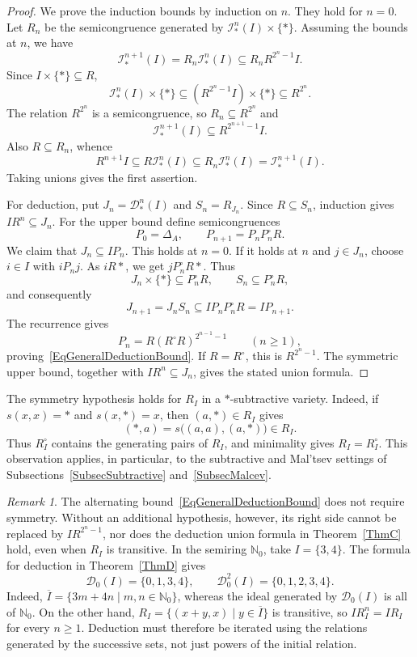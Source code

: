 \documentclass[12pt,english]{amsart}
\theoremstyle{definition}
\numberwithin{equation}{section}
\theoremstyle{remark}
\newtheorem{remark}[theorem]{Remark}
\newcommand{\indn}[2]{\mathcal{I}^{#2}_\top(#1)}
\newcommand{\dedn}[2]{\mathcal{D}^{#2}_\top(#1)}
\renewcommand{\top}{\ast}
\begin{document}
\begin{proof}
We prove the induction bounds by induction on $n$. They hold for $n=0$.
Let $R_n$ be the semicongruence generated by
$\indn In\times\{\top\}$. Assuming the bounds at $n$, we have
\[
\indn I{n+1}=R_n\indn In\subseteq R_nR^{2^n-1}I.
\]
Since $I\times\{\top\}\subseteq R$,
\[
\indn In\times\{\top\}\subseteq
(R^{2^n-1}I)\times\{\top\}\subseteq R^{2^n}.
\]
The relation $R^{2^n}$ is a semicongruence, so $R_n\subseteq R^{2^n}$ and
\[
\indn I{n+1}\subseteq R^{2^{n+1}-1}I.
\]
Also $R\subseteq R_n$, whence
\[
R^{n+1}I\subseteq R\indn In
\subseteq R_n\indn In=\indn I{n+1}.
\]
Taking unions gives the first assertion.

For deduction, put $J_n=\dedn In$ and $S_n=R_{J_n}$. Since
$R\subseteq S_n$, induction gives $IR^n\subseteq J_n$.
For the upper bound define semicongruences
\[
P_0=\Delta_A,\qquad P_{n+1}=P_nP_n^\circ R.
\]
We claim that $J_n\subseteq IP_n$. This holds at $n=0$. If it holds
at $n$ and $j\in J_n$, choose $i\in I$ with $iP_nj$.
As $iR\top$, we get $jP_n^\circ R\top$. Thus
\[
J_n\times\{\top\}\subseteq P_n^\circ R,\qquad
S_n\subseteq P_n^\circ R,
\]
and consequently
\[
J_{n+1}=J_nS_n\subseteq IP_nP_n^\circ R=IP_{n+1}.
\]
The recurrence gives
\[
P_n=R(R^\circ R)^{2^{n-1}-1}\qquad(n\geqslant1),
\]
proving~\eqref{EqGeneralDeductionBound}. If $R=R^\circ$, this is
$R^{2^n-1}$. The symmetric upper bound, together with
$IR^n\subseteq J_n$, gives the stated union formula.
\end{proof}

The symmetry hypothesis holds for $R_I$ in a $\top$-subtractive variety. Indeed, if $s(x,x)=\top$ and $s(x,\top)=x$, then $(a,\top)\in R_I$ gives
\[
(\top,a)=s\bigl((a,a),(a,\top)\bigr)\in R_I.
\]
Thus $R_I^\circ$ contains the generating pairs of $R_I$, and minimality gives $R_I=R_I^\circ$. This observation applies, in particular, to the subtractive and Mal'tsev settings of Subsections~\ref{SubsecSubtractive} and~\ref{SubsecMalcev}.

\begin{remark}\label{RemDeductionCaution}
The alternating bound~\eqref{EqGeneralDeductionBound} does not require symmetry. Without an additional hypothesis, however, its right side cannot be replaced by $IR^{2^n-1}$, nor does the deduction union formula in Theorem~\ref{ThmC} hold, even when $R_I$ is transitive. In the semiring $\mathbb N_0$, take $I=\{3,4\}$. The formula for deduction in Theorem~\ref{ThmD} gives
\[
\mathcal D_0(I)=\{0,1,3,4\},
\qquad
\mathcal D_0^2(I)=\{0,1,2,3,4\}.
\]
Indeed, $\overline I=\{3m+4n\mid m,n\in\mathbb N_0\}$, whereas the ideal generated by $\mathcal D_0(I)$ is all of $\mathbb N_0$. On the other hand, $R_I=\{(x+y,x)\mid y\in\overline I\}$ is transitive, so $IR_I^n=IR_I$ for every $n\geqslant1$. Deduction must therefore be iterated using the relations generated by the successive sets, not just powers of the initial relation.
\end{remark}
\end{document}
